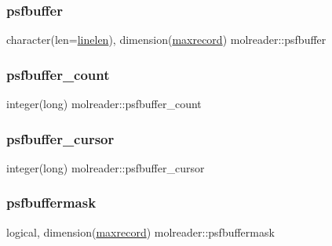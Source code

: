 \subsubsection{\texorpdfstring{psfbuffer}{psfbuffer}}
{\footnotesize\ttfamily character(len=\hyperlink{namespacemolreader_acd493d996a1fcd0ed77937e925c9b7fe}{linelen}), dimension(\hyperlink{namespacemolreader_a7192fdfba4bcb0ee7504a9c6695c7106}{maxrecord}) molreader\+::psfbuffer\hspace{0.3cm}{\ttfamily [private]}}

\mbox{\label{namespacemolreader_af2dddaa7f6249a39287ffcdcbe2ce558}} 
\subsubsection{\texorpdfstring{psfbuffer\+\_\+count}{psfbuffer\_count}}
{\footnotesize\ttfamily integer(long) molreader\+::psfbuffer\+\_\+count\hspace{0.3cm}{\ttfamily [private]}}

\mbox{\label{namespacemolreader_ab080c636a2423beb139bdd65dcd884c3}} 
\subsubsection{\texorpdfstring{psfbuffer\+\_\+cursor}{psfbuffer\_cursor}}
{\footnotesize\ttfamily integer(long) molreader\+::psfbuffer\+\_\+cursor\hspace{0.3cm}{\ttfamily [private]}}

\mbox{\label{namespacemolreader_a747bd2c32990916c313506c805317e88}} 
\subsubsection{\texorpdfstring{psfbuffermask}{psfbuffermask}}
{\footnotesize\ttfamily logical, dimension(\hyperlink{namespacemolreader_a7192fdfba4bcb0ee7504a9c6695c7106}{maxrecord}) molreader\+::psfbuffermask\hspace{0.3cm}{\ttfamily [private]}}

